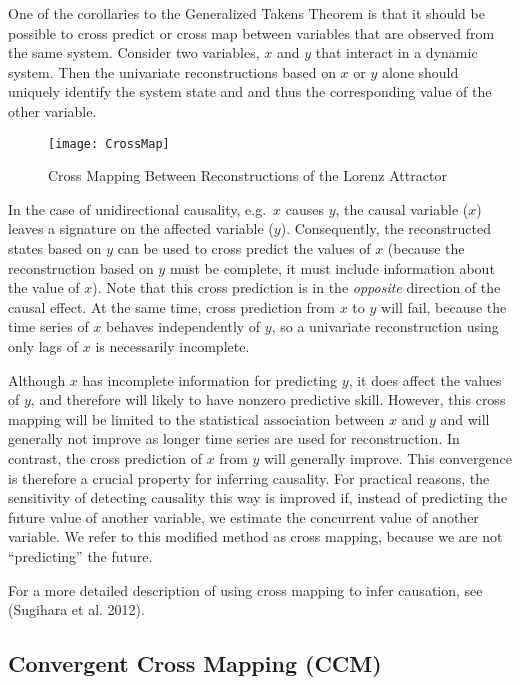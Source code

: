 \documentclass[]{article}
\begin{document}
One of the corollaries to the Generalized Takens Theorem is that it
should be possible to cross predict or cross map between variables that
are observed from the same system. Consider two variables, \(x\) and
\(y\) that interact in a dynamic system. Then the univariate
reconstructions based on \(x\) or \(y\) alone should uniquely identify
the system state and and thus the corresponding value of the other
variable.

\begin{figure}[h]

{\centering \texttt{[image: CrossMap]} 

}

\caption{Cross Mapping Between Reconstructions of the Lorenz Attractor}\label{fig:fig_cross_map}
\end{figure}

In the case of unidirectional causality, e.g.~\(x\) causes \(y\), the
causal variable (\(x\)) leaves a signature on the affected variable
(\(y\)). Consequently, the reconstructed states based on \(y\) can be
used to cross predict the values of \(x\) (because the reconstruction
based on \(y\) must be complete, it must include information about the
value of \(x\)). Note that this cross prediction is in the
\emph{opposite} direction of the causal effect. At the same time, cross
prediction from \(x\) to \(y\) will fail, because the time series of
\(x\) behaves independently of \(y\), so a univariate reconstruction
using only lags of \(x\) is necessarily incomplete.

Although \(x\) has incomplete information for predicting \(y\), it does
affect the values of \(y\), and therefore will likely to have nonzero
predictive skill. However, this cross mapping will be limited to the
statistical association between \(x\) and \(y\) and will generally not
improve as longer time series are used for reconstruction. In contrast,
the cross prediction of \(x\) from \(y\) will generally improve. This
convergence is therefore a crucial property for inferring causality. For
practical reasons, the sensitivity of detecting causality this way is
improved if, instead of predicting the future value of another variable,
we estimate the concurrent value of another variable. We refer to this
modified method as cross mapping, because we are not ``predicting'' the
future.

For a more detailed description of using cross mapping to infer
causation, see (Sugihara et al. 2012).

\hypertarget{convergent-cross-mapping-ccm}{%
\subsection{Convergent Cross Mapping
(CCM)}\label{convergent-cross-mapping-ccm}}
\end{document}
